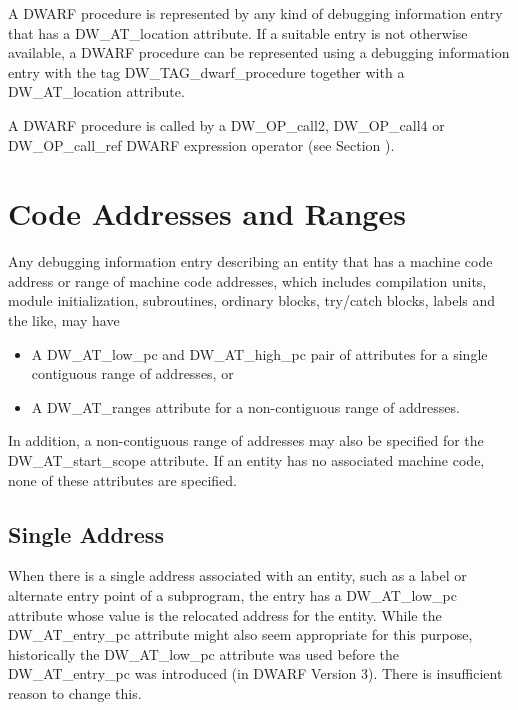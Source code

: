 A DWARF procedure is represented by any
kind of debugging information entry that has a DW\-\_AT\-\_location
attribute. If a suitable entry is not otherwise available,
a DWARF procedure can be represented using a debugging
information entry with the tag DW\-\_TAG\-\_dwarf\-\_procedure
together with a DW\-\_AT\-\_location attribute.  

A DWARF procedure
is called by a DW\-\_OP\-\_call2, 
DW\-\_OP\-\_call4 or 
DW\-\_OP\-\_call\-\_ref
DWARF expression operator 
(see Section ).

\section{Code Addresses and Ranges}
\label{chap:codeaddressesandranges}
Any debugging information entry describing an entity that has
a machine code address or range of machine code addresses,
which includes compilation units, module initialization,
subroutines, ordinary blocks, try/catch blocks, labels and
the like, may have

\begin{itemize}
\item A DW\_AT\_low\_pc and DW\_AT\_high\_pc pair of 
attributes for a single contiguous range of
addresses, or

\item A DW\_AT\_ranges attribute for a non-contiguous range of addresses.
\end{itemize}

In addition, a non-contiguous range of 
addresses may also be specified for the
DW\_AT\_start\_scope attribute.
If an entity has no associated machine code, 
none of these attributes are specified.

\subsection{Single Address} 
When there is a single address associated with an entity,
such as a label or alternate entry point of a subprogram,
the entry has a DW\_AT\_low\_pc attribute whose value is the
relocated address for the entity.  While the DW\_AT\_entry\_pc
attribute might also seem appropriate for this purpose,
historically the DW\_AT\_low\_pc attribute was used before the
DW\_AT\_entry\_pc was introduced (in DWARF Version 3). There is
insufficient reason to change this.

